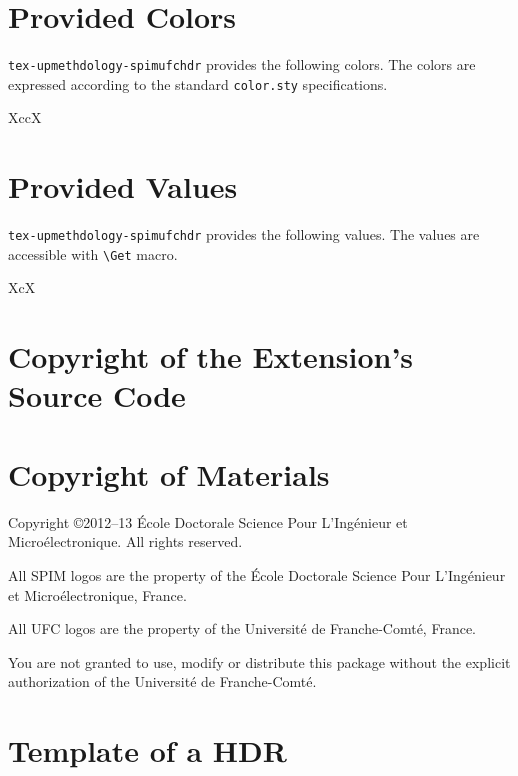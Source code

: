 \documentclass[english]{spimufchdr}
\gdef\upmextensiondoccolorlist{}
\gdef\upmextensiondocvaluelist{}
\begin{document}
\section{Provided Colors}

\texttt{tex-upmethdology-spimufchdr} provides the following colors. The colors are expressed according to the standard \texttt{color.sty} specifications.

\begin{mtabular}{4}{XccX}
\upmextensiondoccolorlist
\end{mtabular}

\section{Provided Values}

\texttt{tex-upmethdology-spimufchdr} provides the following values. The values are accessible with \texttt{{\textbackslash}Get} macro.

\begin{mtabular}{3}{XcX}
\upmextensiondocvaluelist
\end{mtabular}

\section{Copyright of the Extension's Source Code}



\section{Copyright of Materials}

Copyright \copyright 2012--13 \'Ecole Doctorale Science Pour L'Ing\'enieur et Micro\'electronique. All rights reserved.

All SPIM logos are the property of the \'Ecole Doctorale Science Pour L'Ing\'enieur et Micro\'electronique, France.

All UFC logos are the property of the Universit\'e de Franche-Comt\'e, France.

You are not granted to use, modify or distribute this package without the explicit authorization of the Universit\'e de Franche-Comt\'e.

\section{Template of a HDR}
\end{document}
